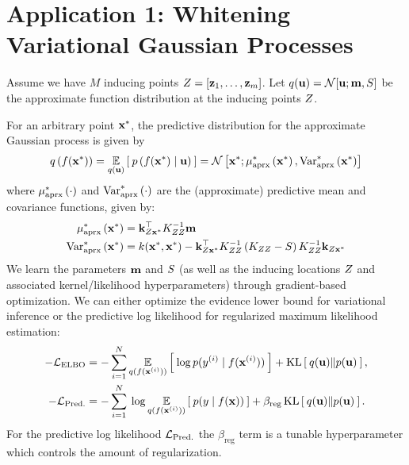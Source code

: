 \section{Application 1: Whitening Variational Gaussian Processes}
\label{sec:variational_results}

Assume we have $M$ inducing points $Z = [\mathbf{z}_1, \ldots, \mathbf{z}_m]$.
Let $q(\bu) = \normaldist{\bu; \bm}{\bS}$ be the approximate function distribution at the inducing points $Z$.

For an arbitrary point $\mathbf{x}^*$, the predictive distribution for the approximate Gaussian process is given by
%
\begin{equation}
  q \left( f(\bxtest) \right) = \Evover{q(\bu)}{ \: p\left( f(\bxtest) \mid \bu \right) \: }
  = \normaldist{ \bxtest; \ameantest{ \bxtest }} { \avartest{ \bxtest }}
  \label{eqn:approx_pred}
\end{equation}
%
where $\mu^*_\text{aprx} \left( \cdot \right)$ and $\text{Var}^*_\text{aprx} \left( \cdot \right)$ are the (approximate) predictive mean and covariance functions, given by:
%
\begin{align}
  \mu^*_\text{aprx} \left( \mathbf{x}^* \right) &= \mathbf{k}_{Z\mathbf{x}^*}^\top K_{ZZ}^{-1} \mathbf{m}
  \label{eqn:approx_pred_mean} \\
  \text{Var}^*_\text{aprx} \left( \mathbf{x}^* \right) &= k(\mathbf{x}^*, \mathbf{x}^*) -
    \mathbf{k}_{Z\mathbf{x}^*}^\top K_{ZZ}^{-1} \left( K_{ZZ} - S \right) K_{ZZ}^{-1} \mathbf{k}_{Z\mathbf{x}^*}
  \label{eqn:approx_pred_covar}
\end{align}
%
We learn the parameters $\mathbf{m}$ and $S$ (as well as the inducing locations $Z$ and associated kernel/likelihood hyperparameters) through gradient-based optimization.
We can either optimize the evidence lower bound \cite{hensman2015scalable} for variational inference or the predictive log likelihood \cite{jankowiak2020parametric} for regularized maximum likelihood estimation:
%
\begin{align}
	-\mathcal L_\text{ELBO} &= -\sum_{i=1}^N \operatorname*{\mathbb{E}}_{q(f(\mathbf{x}^{(i)}))} \left[   \: \log p( y^{(i)} \mid f(\mathbf{x}^{(i)}) ) \:  \right] + \operatorname*{KL} \left[ \:  q(\mathbf{u})  \Vert  p(\mathbf{u})  \: \right],
	\label{eqn:elbo}
	\\
	-\mathcal L_\text{Pred.} &= -\sum_{i=1}^N \: \log \operatorname*{\mathbb{E}}_{q(f(\mathbf{x}^{(i)}))} \left[   \: p( y \mid f(\mathbf{x}) ) \:  \right] + \beta_\text{reg} \operatorname*{KL} \left[ \:  q(\mathbf{u})  \Vert  p(\mathbf{u})  \: \right].
	\label{eqn:predll}
\end{align}
%
For the predictive log likelihood $\mathcal L_\text{Pred.}$ the $\beta_\text{reg}$ term is a tunable hyperparameter which controls the amount of regularization.



